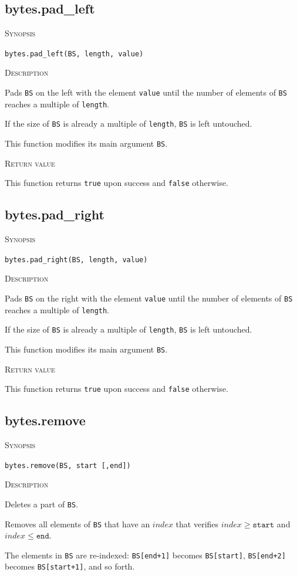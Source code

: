 \documentclass[11pt]{report}
\newcommand{\mansection}[1]{\vspace{0.5em}\par\noindent\textsc{#1}\vspace{0.5em}\par}
\newcommand{\syn}[1]{\texttt{#1}}
\begin{document}
\subsection{bytes.pad\_left}

\mansection{Synopsis}
\syn{bytes.pad\_left(BS, length, value)}

\mansection{Description}
  Pads \syn{BS} on the left with the element \syn{value} until the number of elements 
  of \syn{BS} reaches a multiple of \syn{length}.

  If the size of \syn{BS} is already a multiple of \syn{length}, \syn{BS} is left untouched.

  This function modifies its main argument \syn{BS}.
  
\mansection{Return value}
  This function returns \syn{true} upon success and \syn{false} otherwise.


\subsection{bytes.pad\_right}

\mansection{Synopsis}
\syn{bytes.pad\_right(BS, length, value)}

\mansection{Description}
  Pads \syn{BS} on the right with the element \syn{value} until the number of elements 
  of \syn{BS} reaches a multiple of \syn{length}.

  If the size of \syn{BS} is already a multiple of \syn{length}, \syn{BS} is left untouched.

  This function modifies its main argument \syn{BS}.
  
\mansection{Return value}
  This function returns \syn{true} upon success and \syn{false} otherwise.


\subsection{bytes.remove}

\mansection{Synopsis}
\syn{bytes.remove(BS, start [,end])}

\mansection{Description}
  Deletes a part of \syn{BS}.

  Removes all elements of \syn{BS} that have an $index$ that verifies 
  $index \geq \syn{start}$ and $index \leq \syn{end}$.

  The elements in \syn{BS} are re-indexed: \syn{BS[end+1]} becomes \syn{BS[start]},
  \syn{BS[end+2]} becomes \syn{BS[start+1]}, and so forth.
\end{document}
